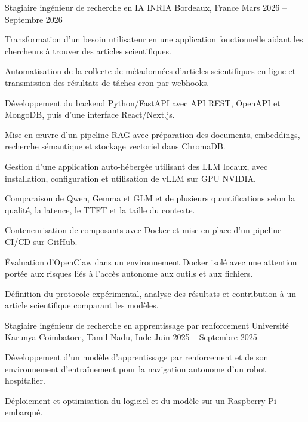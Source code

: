 
\begin{cventries}
  \cventry
    {Stagiaire ingénieur de recherche en IA}
    {INRIA}
    {Bordeaux, France}
    {Mars 2026 -- Septembre 2026}
    {
      \begin{cvitems}
        \item {Transformation d’un besoin utilisateur en une application fonctionnelle aidant les chercheurs à trouver des articles scientifiques.}
        \item {Automatisation de la collecte de métadonnées d’articles scientifiques en ligne et transmission des résultats de tâches cron par webhooks.}
        \item {Développement du backend Python/FastAPI avec API REST, OpenAPI et MongoDB, puis d’une interface React/Next.js.}
        \item {Mise en œuvre d’un pipeline RAG avec préparation des documents, embeddings, recherche sémantique et stockage vectoriel dans ChromaDB.}
        \item {Gestion d’une application auto-hébergée utilisant des LLM locaux, avec installation, configuration et utilisation de vLLM sur GPU NVIDIA.}
        \item {Comparaison de Qwen, Gemma et GLM et de plusieurs quantifications selon la qualité, la latence, le TTFT et la taille du contexte.}
        \item {Conteneurisation de composants avec Docker et mise en place d’un pipeline CI/CD sur GitHub.}
        \item {Évaluation d’OpenClaw dans un environnement Docker isolé avec une attention portée aux risques liés à l’accès autonome aux outils et aux fichiers.}
        \item {Définition du protocole expérimental, analyse des résultats et contribution à un article scientifique comparant les modèles.}
      \end{cvitems}
    }

  \cventry
    {Stagiaire ingénieur de recherche en apprentissage par renforcement}
    {Université Karunya}
    {Coimbatore, Tamil Nadu, Inde}
    {Juin 2025 -- Septembre 2025}
    {
      \begin{cvitems}
        \item {Développement d’un modèle d’apprentissage par renforcement et de son environnement d’entraînement pour la navigation autonome d’un robot hospitalier.}
        \item {Déploiement et optimisation du logiciel et du modèle sur un Raspberry Pi embarqué.}
      \end{cvitems}
    }
\end{cventries}
